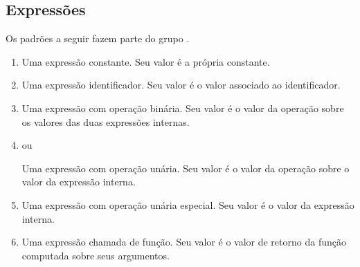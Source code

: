 \documentclass{llncs}
\begin{document}
\subsection{Expressões}
Os padrões a seguir fazem parte do grupo .

\begin{enumerate}
	\item {}

		Uma expressão constante. Seu valor é a própria constante.
	\item {}

		Uma expressão identificador. Seu valor é o valor associado ao identificador.
	\item {}

		Uma expressão com operação binária. Seu valor é o valor da operação sobre os valores das duas expressões internas.
	\item {} ou 

		Uma expressão com operação unária. Seu valor é o valor da operação sobre o valor da expressão interna.
	\item {}

		Uma expressão com operação unária especial. Seu valor é o valor da expressão interna.
	\item {}

		Uma expressão chamada de função. Seu valor é o valor de retorno da função computada sobre seus argumentos.
\end{enumerate}
\end{document}
